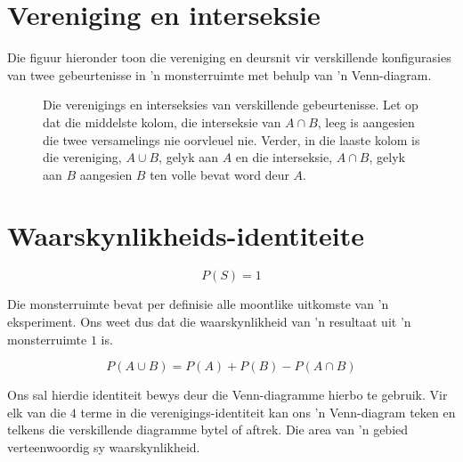 \section{Vereniging en interseksie}




Die figuur hieronder toon die vereniging en deursnit vir verskillende konfigurasies van twee gebeurtenisse in 'n monsterruimte met behulp van 'n Venn-diagram.

\begin{figure}[H]
  
  \begin{caption*}{Die verenigings en interseksies van verskillende gebeurtenisse. Let op dat die middelste kolom, die interseksie van $A \cap B$, leeg is aangesien die twee versamelings nie oorvleuel nie. Verder, in die laaste kolom is die vereniging, $A \cup B$, gelyk aan $A$ en die interseksie, $A \cap B$, gelyk aan $B$ aangesien $B$ ten volle bevat word deur $A$.}\end{caption*}
  \label{fig:venn_union_intersection}
\end{figure}
\par



\section{Waarskynlikheids-identiteite}

  \[P(S)=1\]


Die monsterruimte bevat per definisie alle moontlike uitkomste van 'n eksperiment. Ons weet dus dat die waarskynlikheid van 'n resultaat uit 'n monsterruimte $1$ is.


  \[P(A \cup B) = P(A) + P(B) - P(A \cap B)\]


Ons sal hierdie identiteit bewys deur die Venn-diagramme hierbo te gebruik. Vir elk van die $4$ terme in die verenigings-identiteit kan ons 'n Venn-diagram teken en telkens die verskillende diagramme bytel of aftrek. Die area van 'n gebied verteenwoordig sy waarskynlikheid.\par

